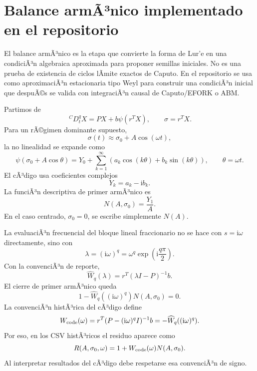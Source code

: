 \documentclass[11pt]{article}
\newcommand{\CaputoD}{\,{}^{C}D_t^q}
\newcommand{\ii}{\mathrm{i}}
\begin{document}
\section{Balance armÃ³nico implementado en el repositorio}
\label{sec:balance_armonico_detallado}

El balance armÃ³nico es la etapa que convierte la forma de Lur'e en una condiciÃ³n algebraica aproximada para proponer semillas iniciales. No es una prueba de existencia de ciclos lÃ­mite exactos de Caputo. En el repositorio se usa como aproximaciÃ³n estacionaria tipo Weyl para construir una condiciÃ³n inicial que despuÃ©s se valida con integraciÃ³n causal de Caputo/EFORK o ABM.

Partimos de
\begin{equation}
\CaputoD X=PX+b\psi(r^TX),
\qquad \sigma=r^TX.
\end{equation}
Para un rÃ©gimen dominante supuesto,
\begin{equation}
\sigma(t)\approx \sigma_0+A\cos(\omega t),
\end{equation}
la no linealidad se expande como
\begin{equation}
\psi(\sigma_0+A\cos \theta)
=Y_0+\sum_{k=1}^{\infty}
\left(a_k\cos(k\theta)+b_k\sin(k\theta)\right),
\qquad \theta=\omega t.
\end{equation}
El cÃ³digo usa coeficientes complejos
\begin{equation}
Y_k=a_k-\ii b_k.
\end{equation}
La funciÃ³n descriptiva de primer armÃ³nico es
\begin{equation}
N(A,\sigma_0)=\frac{Y_1}{A}.
\end{equation}
En el caso centrado, \(\sigma_0=0\), se escribe simplemente \(N(A)\).

La evaluaciÃ³n frecuencial del bloque lineal fraccionario no se hace con \(s=\ii\omega\) directamente, sino con
\begin{equation}
\lambda=(\ii\omega)^q=\omega^q\exp\left(\ii\frac{q\pi}{2}\right).
\end{equation}
Con la convenciÃ³n de reporte,
\begin{equation}
\widehat W_q(\lambda)=r^T(\lambda I-P)^{-1}b.
\end{equation}
El cierre de primer armÃ³nico queda
\begin{equation}
1-\widehat W_q((\ii\omega)^q)N(A,\sigma_0)=0.
\end{equation}
La convenciÃ³n histÃ³rica del cÃ³digo define
\begin{equation}
W_{\rm code}(\omega)=r^T(P-(\ii\omega)^qI)^{-1}b
=-\widehat W_q((\ii\omega)^q).
\end{equation}
Por eso, en los CSV histÃ³ricos el residuo aparece como
\begin{equation}
R(A,\sigma_0,\omega)=1+W_{\rm code}(\omega)N(A,\sigma_0).
\end{equation}
Al interpretar resultados del cÃ³digo debe respetarse esa convenciÃ³n de signo.
\end{document}
